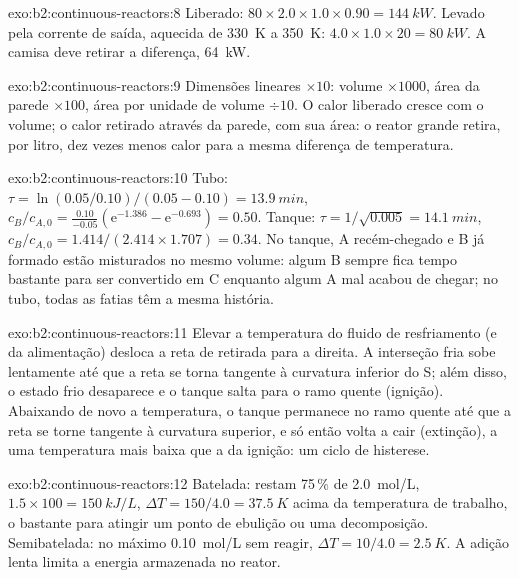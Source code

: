\begin{solution}{exo:b2:continuous-reactors:8}
Liberado: $80 \times 2.0 \times 1.0 \times 0.90 = \qty{144}{kW}$. Levado pela
corrente de saída, aquecida de \qty{330}{K} a \qty{350}{K}: $4.0 \times 1.0 \times 20 =
\qty{80}{kW}$. A camisa deve retirar a diferença, \qty{64}{kW}.
\end{solution}

\begin{solution}{exo:b2:continuous-reactors:9}
Dimensões lineares $\times 10$: volume $\times 1000$, área da parede $\times 100$,
área por unidade de volume $\div 10$. O calor liberado cresce com o volume; o
calor retirado através da parede, com sua área: o reator grande retira, por
litro, dez vezes menos calor para a mesma diferença de temperatura.
\end{solution}

\begin{solution}{exo:b2:continuous-reactors:10}
Tubo: $\tau = \ln(0.05/0.10)/(0.05 - 0.10) = \qty{13.9}{min}$, $c_B/c_{A,0} =
\frac{0.10}{-0.05}(\mathrm e^{-1.386} - \mathrm e^{-0.693}) = 0.50$. Tanque: $\tau =
1/\sqrt{0.005} = \qty{14.1}{min}$, $c_B/c_{A,0} = 1.414/(2.414 \times 1.707) =
0.34$. No tanque, A recém-chegado e B já formado estão misturados no mesmo
volume: algum B sempre fica tempo bastante para ser convertido em C enquanto
algum A mal acabou de chegar; no tubo, todas as fatias têm a mesma história.
\end{solution}

\begin{solution}{exo:b2:continuous-reactors:11}
Elevar a temperatura do fluido de resfriamento (e da alimentação) desloca a
reta de retirada para a direita. A interseção fria sobe lentamente até que a
reta se torna tangente à curvatura inferior do S; além disso, o estado frio
desaparece e o tanque salta para o ramo quente (ignição). Abaixando de novo a
temperatura, o tanque permanece no ramo quente até que a reta se torne
tangente à curvatura superior, e só então volta a cair (extinção), a uma
temperatura mais baixa que a da ignição: um ciclo de histerese.
\end{solution}

\begin{solution}{exo:b2:continuous-reactors:12}
Batelada: restam 75\,\% de \qty{2.0}{mol/L}, $1.5 \times 100 = \qty{150}{kJ/L}$,
$\Delta T = 150/4.0 = \qty{37.5}{K}$ acima da temperatura de trabalho, o
bastante para atingir um ponto de ebulição ou uma decomposição. Semibatelada:
no máximo \qty{0.10}{mol/L} sem reagir, $\Delta T = 10/4.0 = \qty{2.5}{K}$. A
adição lenta limita a energia armazenada no reator.
\end{solution}

